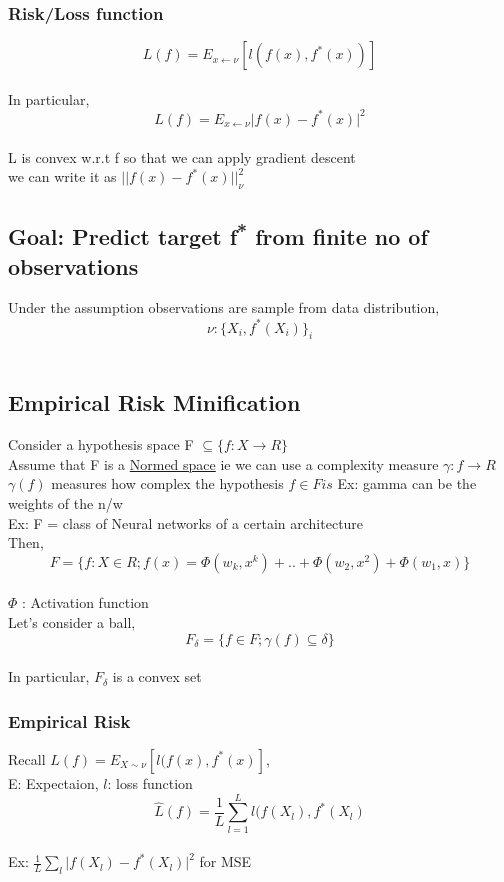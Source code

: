 \documentclass[11pt]{article}
\begin{document}
\subsubsection{Risk/Loss function}
\label{sec:orgc68642f}
\[L(f) = E_{x \gets \nu}[l(f(x), f^*(x))] \]\\
In particular,\\
\[ L(f) = E_{x \gets \nu} \lvert f(x) - f^*(x) \rvert^2 \]\\
L is convex w.r.t f so that we can apply gradient descent\\
we can write it as \(\lvert\lvert f(x) - f^*(x) \rvert\rvert ^2_\nu\)\\
\subsection{Goal: Predict target f\textsuperscript{*} from finite no of observations}
\label{sec:org7d30851}
Under the assumption observations are sample from data distribution,\\
\[\nu : \{X_i, f^*(X_i)\}_i \]\\
\subsection{Empirical Risk Minification}
\label{sec:org6e4e774}
Consider a hypothesis space F \(\subseteq  \{ f: X \to R \}\)\\
Assume that F is a \href{file:///home/sriram/Courses/MathsForDL/References.org}{Normed space} ie we can use a complexity measure \(\gamma:f \to R\)\\
\(\gamma(f)\) measures how complex the hypothesis \(f \in F is\) Ex: gamma can be the weights of the n/w\\
Ex: F = class of Neural networks of a certain architecture\\
Then,\\
\[ F = \{ f: X \in R; f(x) = \Phi(w_k,x^k)+.. + \Phi(w_2,x^2) + \Phi(w_1,x) \} \]\\
\(\Phi\) : Activation function\\
Let's consider a ball,\\
\[F_\delta = \{ f \in F; \gamma(f) \subseteq \delta \} \]\\
In particular, \(F_\delta\) is a convex set\\
\subsubsection{Empirical Risk}
\label{sec:orgfb35c47}
Recall  \(L(f) = E_{X \sim \nu}[l(f(x),f^*(x)]\),\\
E: Expectaion, \(l\): loss function\\
\[\hat{L}(f) = \frac{1}{L} \sum_{l=1}^L l(f(X_l), f^*(X_l) \]\\
Ex: \(\frac{1}{L} \sum_l \lvert f(X_l) - f^*(X_l) \rvert ^2\) for MSE\\
\end{document}
